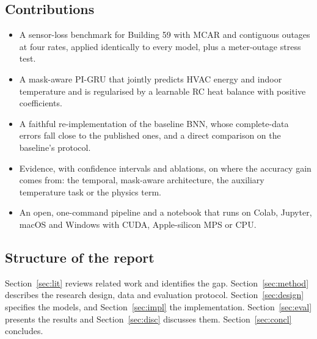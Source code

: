 \subsection{Contributions}
\begin{itemize}[nosep]
\item A sensor-loss benchmark for Building 59 with MCAR and contiguous outages at four rates, applied identically to every model, plus a meter-outage stress test.
\item A mask-aware PI-GRU that jointly predicts HVAC energy and indoor temperature and is regularised by a learnable RC heat balance with positive coefficients.
\item A faithful re-implementation of the baseline BNN, whose complete-data errors fall close to the published ones, and a direct comparison on the baseline's protocol.
\item Evidence, with confidence intervals and ablations, on where the accuracy gain comes from: the temporal, mask-aware architecture, the auxiliary temperature task or the physics term.
\item An open, one-command pipeline and a notebook that runs on Colab, Jupyter, macOS and Windows with CUDA, Apple-silicon MPS or CPU.
\end{itemize}

\subsection{Structure of the report}
Section~\ref{sec:lit} reviews related work and identifies the gap. Section~\ref{sec:method} describes the research design, data and evaluation protocol. Section~\ref{sec:design} specifies the models, and Section~\ref{sec:impl} the implementation. Section~\ref{sec:eval} presents the results and Section~\ref{sec:disc} discusses them. Section~\ref{sec:concl} concludes.
